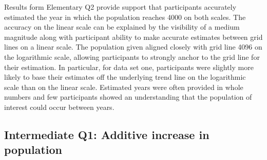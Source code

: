 \documentclass[print]{nuthesis}
\begin{document}
Results form Elementary Q2 provide support that participants accurately estimated the year in which the population reaches 4000 on both scales.
The accuracy on the linear scale can be explained by the visibility of a medium magnitude along with participant ability to make accurate estimates between grid lines on a linear scale.
The population given aligned closely with grid line 4096 on the logarithmic scale, allowing participants to strongly anchor to the grid line for their estimation.
In particular, for data set one, participants were slightly more likely to base their estimates off the underlying trend line on the logarithmic scale than on the linear scale.
Estimated years were often provided in whole numbers and few participants showed an understanding that the population of interest could occur between years.

\hypertarget{intermediate-q1-additive-increase-in-population}{%
\subsection{Intermediate Q1: Additive increase in population}\label{intermediate-q1-additive-increase-in-population}}
\end{document}
